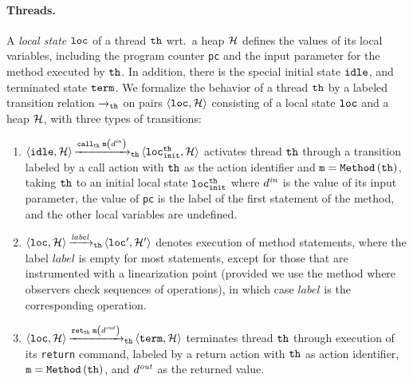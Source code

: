 \paragraph{Threads.}
A {\it local state} ${\tt loc}$ of a thread ${\tt th}$
wrt.\ a heap ${\mathcal H}$ defines 
the values of its local variables, including the program counter
{\tt pc} and the input parameter for the method executed by ${\tt th}$.
In addition, there is the special initial state ${\tt idle}$,
and terminated state ${\tt term}$.
%
%
We formalize the behavior of a thread ${\tt th}$ by
a labeled transition relation ${\xrightarrow{}{}}_{\!\!{\tt th}}$
on pairs $\left\langle{\tt loc},{\mathcal H}\right\rangle$ consisting of a local state
${\tt loc}$ and a heap ${\mathcal H}$, with three types of transitions:
%
\begin{enumerate}
\item
$\left\langle{\tt idle},{\mathcal H}\right\rangle
{\xrightarrow{{\mathtt{call}_{{\tt th}}\; {\tt m}\left(d^{\it in}\right)}}{}}_{\!\!{\tt th}}
\left\langle{\tt loc}_{\tt init}^{{\tt th}},{\mathcal H}\right\rangle$ activates
thread ${\tt th}$ through a transition
labeled by a call action with ${\tt th}$ as the action identifier and
${\tt m}={\tt Method}\left({\tt th}\right)$, taking ${\tt th}$
to an initial local state ${\tt loc}_{\tt init}^{{\tt th}}$
where $d^{\it in}$ is the value of its input parameter,
the value of {\tt pc} is the label of the first statement of the method, and
the other local variables are undefined.
\item
$\left\langle{\tt loc},{\mathcal H}\right\rangle{\xrightarrow{\mathit{label}}{}}_{\!\!{\tt th}}\left\langle{\tt loc}',{\mathcal H}'\right\rangle$
  denotes execution of method statements, where the label $\mathit{label}$ is
  empty for most statements, except for those that are instrumented
  with a linearization point (provided we use the method where
  observers check sequences of operations),
  in which case $\mathit{label}$ is the corresponding operation.
%
%
\item 
$\left\langle{\tt loc},{\mathcal H}\right\rangle{\xrightarrow{\mathtt{ret}_{{\tt th}}\; {\tt m}\left(d^{\it out}\right)}{}}_{\!\!{\tt th}}
\left\langle{\tt term},{\mathcal H}\right\rangle$ terminates
thread ${\tt th}$ through execution of its {\tt return} command, labeled
by a return action with ${\tt th}$ as action identifier,
${\tt m}={\tt Method}\left({\tt th}\right)$, and $d^{\it out}$
as the returned value.
\end{enumerate}


